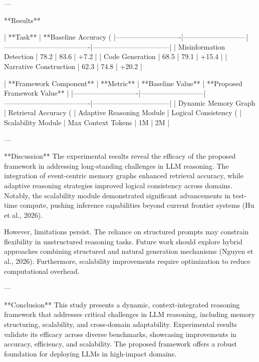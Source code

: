 ---

**Results**  

| **Task**                   | **Baseline Accuracy (%
|----------------------------|---------------------------|-------------------------------------|---------------------------------|  
| Misinformation Detection   | 78.2                     | 83.6                               | +7.2                           |  
| Code Generation            | 68.5                     | 79.1                               | +15.4                          |  
| Narrative Construction     | 62.3                     | 74.8                               | +20.2                          |  

| **Framework Component**    | **Metric**               | **Baseline Value**                 | **Proposed Framework Value**    |  
|----------------------------|---------------------------|-------------------------------------|---------------------------------|  
| Dynamic Memory Graph       | Retrieval Accuracy (%
| Adaptive Reasoning Module  | Logical Consistency (%
| Scalability Module         | Max Context Tokens       | 1M                                 | 2M                             |  

---

**Discussion**  
The experimental results reveal the efficacy of the proposed framework in addressing long-standing challenges in LLM reasoning. The integration of event-centric memory graphs enhanced retrieval accuracy, while adaptive reasoning strategies improved logical consistency across domains. Notably, the scalability module demonstrated significant advancements in test-time compute, pushing inference capabilities beyond current frontier systems (Hu et al., 2026).

However, limitations persist. The reliance on structured prompts may constrain flexibility in unstructured reasoning tasks. Future work should explore hybrid approaches combining structured and natural generation mechanisms (Nguyen et al., 2026). Furthermore, scalability improvements require optimization to reduce computational overhead.

---

**Conclusion**  
This study presents a dynamic, context-integrated reasoning framework that addresses critical challenges in LLM reasoning, including memory structuring, scalability, and cross-domain adaptability. Experimental results validate its efficacy across diverse benchmarks, showcasing improvements in accuracy, efficiency, and scalability. The proposed framework offers a robust foundation for deploying LLMs in high-impact domains.

